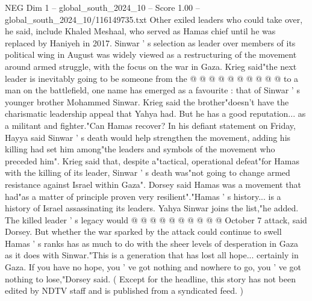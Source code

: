 \begin{textsample}{NEG Dim 1 – global\_south\_2024\_10 – Score 1.00 – global\_south\_2024\_10/116149735.txt}
Other exiled leaders who could take over, he said, include Khaled Meshaal, who served as Hamas chief until he was replaced by Haniyeh in 2017.
Sinwar ' s selection as leader over members of its political wing in August was widely viewed as a restructuring of the movement around armed struggle, with the focus on the war in Gaza.
Krieg said"the next leader is inevitably going to be someone from the @ @ @ @ @ @ @ @ @ @ to a man on the battlefield, one name has emerged as a favourite : that of Sinwar ' s younger brother Mohammed Sinwar.
Krieg said the brother"doesn't have the charismatic leadership appeal that Yahya had.
But he has a good reputation... as a militant and fighter."Can Hamas recover?
In his defiant statement on Friday, Hayya said Sinwar ' s death would help strengthen the movement, adding his killing had set him among"the leaders and symbols of the movement who preceded him".
Krieg said that, despite a"tactical, operational defeat"for Hamas with the killing of its leader, Sinwar ' s death was"not going to change armed resistance against Israel within Gaza".
Dorsey said Hamas was a movement that had"as a matter of principle proven very resilient"."Hamas ' s history... is a history of Israel assassinating its leaders.
Yahya Sinwar joins the list,"he added.
The killed leader ' s legacy would @ @ @ @ @ @ @ @ @ @ October 7 attack, said Dorsey.
But whether the war sparked by the attack could continue to swell Hamas ' s ranks has as much to do with the sheer levels of desperation in Gaza as it does with Sinwar."This is a generation that has lost all hope... certainly in Gaza.
If you have no hope, you ' ve got nothing and nowhere to go, you ' ve got nothing to lose,"Dorsey said. ( Except for the headline, this story has not been edited by NDTV staff and is published from a syndicated feed. )

\end{textsample}
